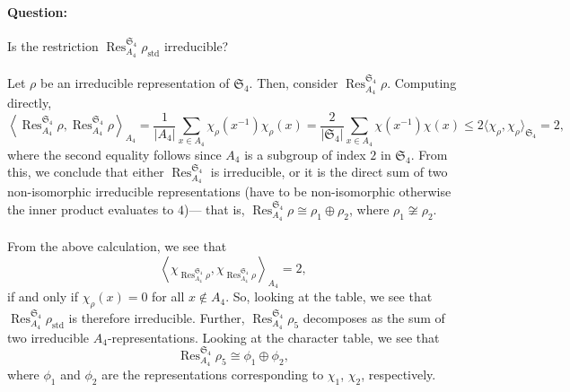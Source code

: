 \documentclass[a4paper]{report}
\theoremstyle{definition}
\theoremstyle{remark}
\theoremstyle{proposition}
\theoremstyle{conjecture}
\theoremstyle{lemma}
\theoremstyle{corollary}
\theoremstyle{exercise}
\theoremstyle{example}
\newcommand{\on}{\operatorname}
\begin{document}
\paragraph{Question:} Is the restriction $\on{Res}_{A_4}^{\mathfrak{S}_4}\rho_{\on{std}}$ irreducible?\\\\
Let $\rho$ be an irreducible representation of $\mathfrak{S}_4$. 
Then, consider $\on{Res}_{A_4}^{\mathfrak{S}_4}\rho$. Computing directly,
$$\left\langle \on{Res}_{A_4}^{\mathfrak{S}_4}\rho, \on{Res}_{A_4}^{\mathfrak{S}_4}\rho\right\rangle_{A_4} = \frac{1}{\vert A_4\vert} \sum_{x \in A_4} \chi_\rho(x^{-1})\chi_\rho(x)  =\frac{2}{\vert\mathfrak{S}_4\vert} \sum_{x \in A_4}\chi(x^{-1})\chi(x) \leq 2 \langle \chi_\rho,\chi_\rho\rangle_{\mathfrak{S}_4} = 2,$$
where the second equality follows since $A_4$ is a subgroup of index $2$
in $\mathfrak{S}_4$.
From this, we conclude that either $\on{Res}_{A_4}^{\mathfrak{S}_4}$ is 
irreducible, or it is the direct sum of two non-isomorphic irreducible
representations (have to be non-isomorphic otherwise the inner product 
evaluates to $4$)--- that is, $\on{Res}_{A_4}^{\mathfrak{S}_4} \rho\cong\rho_1\oplus\rho_2$, where $\rho_1 \not\cong \rho_2$. \\\\
From the above calculation, we see that 
$$\left\langle\chi_{\on{Res}_{A_4}^{\mathfrak{S}_4}\rho},\chi_{\on{Res}_{A_4}^{\mathfrak{S}_4}\rho}\right\rangle_{A_4} = 2,$$
if and only if $\chi_\rho(x) = 0$ for all $x\not\in A_4$. So, looking at 
the table, we see that $\on{Res}_{A_4}^{\mathfrak{S}_4}\rho_{\on{std}}$ 
is therefore irreducible. Further,
$\on{Res}_{A_4}^{\mathfrak{S}_4} \rho_5$ decomposes as the sum of two 
irreducible $A_4$-representations. Looking at the character table, 
we see that 
$$\on{Res}_{A_4}^{\mathfrak{S}_4} \rho_5 \cong \phi_1\oplus \phi_2,$$
where $\phi_1$ and $\phi_2$ are the representations corresponding
to $\chi_1$, $\chi_2$, respectively.
\end{document}
